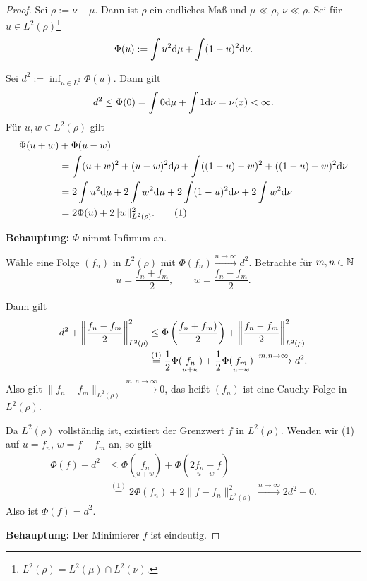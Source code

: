 \documentclass[
 a4paper,
 12pt,
 parskip=half
 ]{scrreprt}
\theoremstyle{plain}
\theoremstyle{definition}
\numberwithin{equation}{section}
\begin{document}
\begin{proof}
  Sei $\rho := \nu + \mu$. Dann ist $\rho$ ein endliches Maß und $\mu \ll
  \rho$, $\nu \ll \rho$. Sei für $u \in L^2(\rho)$\footnote{%
    $L^2(\rho) = L^2(\mu)\cap L^2(\nu)$.}
  \[ \Phi(u) := \int u^2 \mathrm{d} \mu + \int (1-u)^2 \mathrm{d} \nu. \]

  Sei $d^2 := \inf_{u \in L^2} \Phi(u)$. Dann gilt
  \[ d^2 \le \Phi(0) = \int 0 \mathrm{d} \mu + \int 1 \mathrm{d} \nu = \nu(x) <
    \infty. \]
  Für $u,w \in L^2(\rho)$ gilt
  \begin{align*}
    \Phi(u+w) &+ \Phi(u-w) \\
    &= \int (u+w)^2 + (u-w)^2 \mathrm{d} \rho + \int((1-u)-w)^2 + ((1-u)+w)^2 \mathrm{d} \nu \\
    &= 2 \int u^2 \mathrm{d} \mu + 2 \int w^2 \mathrm{d} \mu + 2 \int (1-u)^2 \mathrm{d} \nu + 2 \int w^2 \mathrm{d} \nu \\
    &= 2 \Phi(u) + 2 \| w \|^2_{L^2(\rho)}. \tag{1}
  \end{align*}

  \textbf{Behauptung:} $\Phi$ nimmt Infimum an.

  Wähle eine Folge $(f_n)$ in $L^2(\rho)$ mit $\Phi(f_n) \xrightarrow{n \to
    \infty} d^2$. Betrachte für $m,n \in \mathbb{N}$
  \[ u = \frac{f_n + f_m}{2}, \qquad w = \frac{f_n - f_m}{2}. \]

  Dann gilt
  \begin{align*}
    d^2 + \left\| \frac{f_n - f_m}{2} \right\|^2_{L^2(\rho)}
    &\le \Phi \left( \frac{f_n + f_m)}{2} \right) + \left\| \frac{f_n - f_m}{2} \right\|^2_{L^2(\rho)} \\
    &\overset{(1)}{=}
      \frac{1}{2} \Phi(\underset{u+w}{f_n}) +
      \frac{1}{2} \Phi(\underset{u-w}{f_m})
      \xrightarrow{m,n \to \infty} d^2.
  \end{align*}
  Also gilt $\|f_n - f_m\|_{L^2(\rho)} \xrightarrow{m,n \to \infty} 0$, das
  heißt $(f_n)$ ist eine Cauchy-Folge in $L^2(\rho)$.

  Da $L^2(\rho)$ vollständig ist, existiert der Grenzwert $f$ in $L^2(\rho)$.
  Wenden wir (1) auf $u = f_n$, $w = f - f_m$ an, so gilt
  \begin{align*}
    \Phi(f) + d^2
    &\le \Phi(\underset{u+w}{f_n}) + \Phi(\underset{u+w}{2 f_n - f}) \\
    &\overset{(1)}{=} 2 \Phi(f_n) + 2 \| f - f_n \|^2_{L^2(\rho)} \xrightarrow{n \to \infty} 2 d^2 + 0.
  \end{align*}
  Also ist $\Phi(f) = d^2$.

  \textbf{Behauptung:} Der Minimierer $f$ ist eindeutig.


\end{proof}
\end{document}
